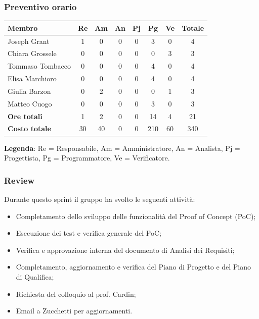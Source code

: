 \documentclass[11pt,a4paper]{article}
\begin{document}
\subsubsection{Preventivo orario}
\begin{center}
    \begin{tabular}{|l|c|c|c|c|c|c|c|}
        \hline
        \textbf{Membro} & \textbf{Re} & \textbf{Am} & \textbf{An} & \textbf{Pj} & \textbf{Pg} & \textbf{Ve} & \textbf{Totale} \\
        \hline
        Joseph Grant & 1 & 0 & 0 & 0 & 3 & 0 & 4 \\
        \hline
        Chiara Grossele & 0 & 0 & 0 & 0 & 0 & 3 & 3 \\
        \hline
        Tommaso Tombacco & 0 & 0 & 0 & 0 & 4 & 0 & 4 \\
        \hline
        Elisa Marchioro & 0 & 0 & 0 & 0 & 4 & 0 & 4 \\
        \hline
        Giulia Barzon & 0 & 2 & 0 & 0 & 0 & 1 & 3 \\
        \hline
        Matteo Cuogo & 0 & 0 & 0 & 0 & 3 & 0 & 3 \\
        \hline
        \textbf{Ore totali} & 1 & 2 & 0 & 0 & 14 & 4 & 21 \\
        \hline
        \textbf{Costo totale} & 30 & 40 & 0 & 0 & 210 & 60 & 340 \\
        \hline
    \end{tabular}
\end{center}

\noindent \textbf{Legenda}: Re = Responsabile, Am = Amministratore, An = Analista, Pj = Progettista, Pg = Programmatore, Ve = Verificatore.

\subsubsection{Review}
Durante questo sprint il gruppo ha svolto le seguenti attività:
\begin{itemize}
    \item Completamento dello sviluppo delle funzionalità del Proof of Concept (PoC);
    \item Esecuzione dei test e verifica generale del PoC;
    \item Verifica e approvazione interna del documento di Analisi dei Requisiti;
    \item Completamento, aggiornamento e verifica del Piano di Progetto e del Piano di Qualifica;
    \item Richiesta del colloquio al prof. Cardin;
    \item Email a Zucchetti per aggiornamenti.
\end{itemize}
\end{document}
